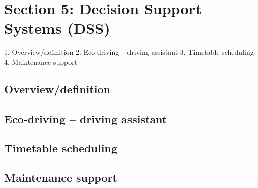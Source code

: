 


\section{Section 5: Decision Support Systems (DSS)}

1.	Overview/definition
2.	Eco-driving – driving assistant
3.	Timetable scheduling
4.	Maintenance support

\subsection{Overview/definition}

\subsection{Eco-driving – driving assistant}

\subsection{Timetable scheduling}

\subsection{Maintenance support}